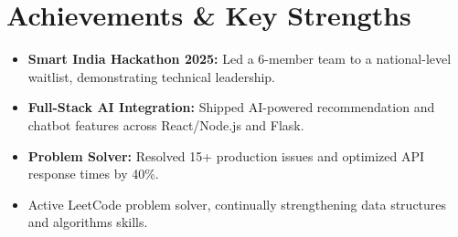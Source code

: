 \documentclass[10pt,a4paper]{article}
\begin{document}
\section*{Achievements \& Key Strengths}
\begin{itemize}
    \item \textbf{Smart India Hackathon 2025:} Led a 6-member team to a national-level waitlist, demonstrating technical leadership.
    \item \textbf{Full-Stack AI Integration:} Shipped AI-powered recommendation and chatbot features across React/Node.js and Flask.
    \item \textbf{Problem Solver:} Resolved 15+ production issues and optimized API response times by 40\%.
    \item Active LeetCode problem solver, continually strengthening data structures and algorithms skills.
\end{itemize}
\end{document}
